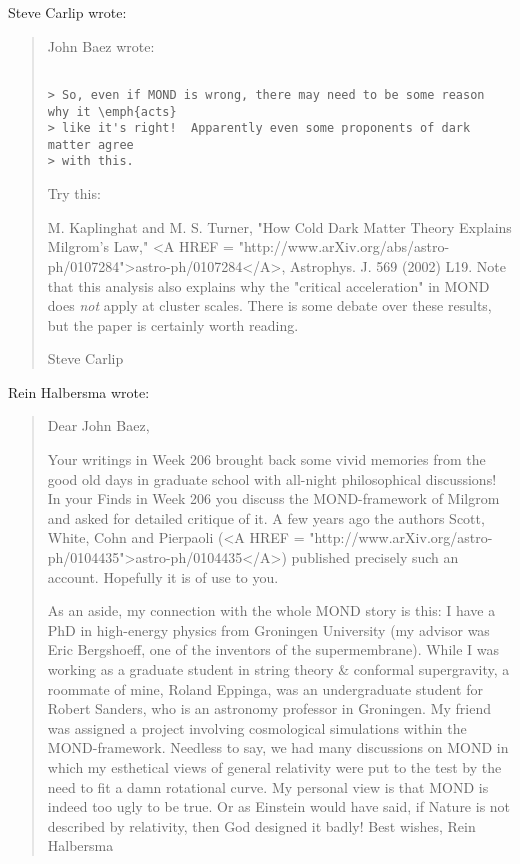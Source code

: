 Steve Carlip wrote:

\begin{quote}
John Baez wrote:


\begin{verbatim}

> So, even if MOND is wrong, there may need to be some reason why it \emph{acts}
> like it's right!  Apparently even some proponents of dark matter agree 
> with this.  
\end{verbatim}
    


Try this:

M. Kaplinghat and M. S. Turner, "How Cold Dark Matter Theory Explains 
Milgrom's Law," 
<A HREF = "http://www.arXiv.org/abs/astro-ph/0107284">astro-ph/0107284</A>, 
Astrophys. J. 569 (2002) L19.  Note
that this analysis also explains why the "critical acceleration"
in MOND does \emph{not} apply at cluster scales.  There is some debate over
these results, but the paper is certainly worth reading.

Steve Carlip
\end{quote}

Rein Halbersma wrote:

\begin{quote}
Dear John Baez,

Your writings in Week 206 brought back some vivid memories from the good old 
days in graduate school with all-night philosophical discussions! In your 
Finds in Week 206 you discuss the MOND-framework of Milgrom and asked for 
detailed critique of it. A few years ago the authors Scott, White, Cohn and 
Pierpaoli (<A HREF = "http://www.arXiv.org/astro-ph/0104435">astro-ph/0104435</A>) published precisely such an account. 
Hopefully it is of use to you.

As an aside, my connection with the whole MOND story is this: I have a PhD in 
high-energy physics from Groningen University (my advisor was Eric 
Bergshoeff, one of the inventors of the supermembrane). While I was working 
as a graduate student in string theory & conformal supergravity, a 
roommate of mine, Roland Eppinga, was an undergraduate student for Robert 
Sanders, who is an astronomy professor in Groningen. My friend was assigned a 
project involving cosmological simulations within the MOND-framework. 
Needless to say, we had many discussions on MOND in which my esthetical 
views of general relativity were put to the test by the need to fit a 
damn rotational curve. 
My personal view is that MOND is indeed too ugly to be true. Or as Einstein 
would have said, if Nature is not described by relativity, then God 
designed it badly! 
Best wishes,
Rein Halbersma
\end{quote} 

